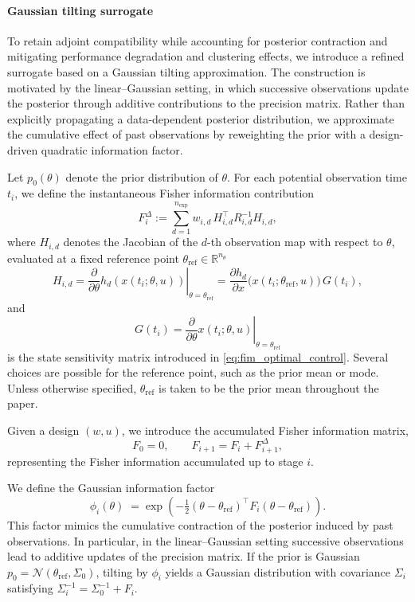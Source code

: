 \documentclass[a4paper,11pt]{article}
\begin{document}
\paragraph{Gaussian tilting surrogate}

To retain adjoint compatibility while accounting for posterior contraction and mitigating performance degradation and clustering effects, we introduce a refined surrogate based on a Gaussian tilting approximation. The construction is motivated by the linear--Gaussian setting, in which successive observations update the posterior through additive contributions to the precision matrix. Rather than explicitly propagating a data-dependent posterior distribution, we approximate the cumulative effect of past observations by reweighting the prior with a design-driven quadratic information factor.

Let \(p_0(\theta)\) denote the prior distribution of \(\theta\). 
For each potential observation time \(t_i\), we define the instantaneous Fisher information contribution
\[
F_i^{\Delta} := \sum_{d=1}^{n_{\mathrm{exp}}} 
w_{i,d}\, H_{i,d}^\top R_{i,d}^{-1} H_{i,d},
\]
where \(H_{i,d}\) denotes the Jacobian of the \(d\)-th observation map with respect to \(\theta\), evaluated at a fixed reference point \(\theta_\mathrm{ref} \in \mathbb{R}^{n_\theta}\)
\[
H_{i,d}
=
\left.
\frac{\partial}{\partial \theta}  h_d(x(t_i;\theta,u))
\right|_{\theta=\theta_\mathrm{ref}}
=
\frac{\partial h_d}{\partial x}\bigl(x(t_i;\theta_\mathrm{ref},u)\bigr)\,
G(t_i),
\]
and 
\[
G(t_i) = \left.\frac{\partial}{\partial \theta} x(t_i;\theta,u)\right|_{\theta=\theta_\mathrm{ref}}
\]
is the state sensitivity matrix introduced in \eqref{eq:fim_optimal_control}. Several choices are possible for the reference point, such as the prior mean or mode. Unless otherwise specified, \(\theta_\mathrm{ref}\) is taken to be the prior mean throughout the paper.

Given a design \((w,u)\), we introduce the accumulated Fisher information matrix, 
\begin{equation} \label{eq:accumulator_definition}
F_0 = 0,
\qquad
F_{i+1} = F_{i} + F_{i+1}^\Delta,
\end{equation}
representing the Fisher information accumulated up to stage $i$.

We define the Gaussian information factor
\[
\phi_i(\theta)
\;=
\exp\!\left(
-\tfrac12(\theta-\theta_\mathrm{ref})^\top F_i(\theta-\theta_\mathrm{ref})
\right).
\]
This factor mimics the cumulative contraction of the posterior induced by past observations. 
In particular, in the linear--Gaussian setting successive observations
lead to additive updates of the precision matrix. If the prior is Gaussian \(p_0 = \mathcal{N}(\theta_\mathrm{ref},\Sigma_0)\), tilting by \(\phi_i\) yields a Gaussian distribution with covariance \(\Sigma_i\) satisfying
\(
\Sigma_i^{-1} = \Sigma_0^{-1} + F_i .
\)
\end{document}
